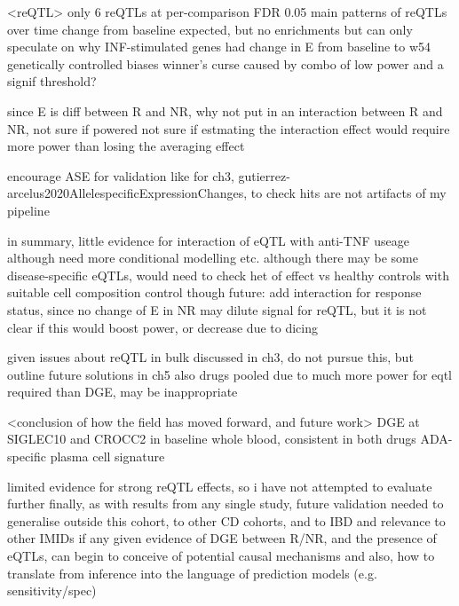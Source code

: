 \begin{outline}
\1 <reQTL>
    \2 only 6 reQTLs at per-comparison FDR 0.05
     main patterns of reQTLs over time
    \2 change from baseline expected, but no enrichments
    \2 but can only speculate on why INF-stimulated genes had change in E from baseline to w54 genetically controlled
    \2 biases
        \3 winner's curse caused by combo of low power and a signif threshold?

since E is diff between R and NR, 
why not put in an interaction between R and NR, not sure if powered
not sure if estmating the interaction effect would require more power
than losing the averaging effect

    \2 encourage ASE for validation like for ch3, gutierrez-arcelus2020AllelespecificExpressionChanges, to check hits are not artifacts of my pipeline

    \2 in summary, little evidence for interaction of eQTL with anti-TNF useage
        \3 although need more conditional modelling etc.
        \3 although there may be some disease-specific eQTLs, would need to check het of effect vs healthy controls with suitable cell composition control though
        \3 future: add interaction for response status, since no change of E in NR may dilute signal for reQTL, but it is not clear if this would boost power, or decrease due to dicing

    \2 given issues about reQTL in bulk discussed in ch3, do not pursue this, but outline future solutions in ch5
    also drugs pooled due to much more power for eqtl required than DGE, may be inappropriate

\1 <conclusion of how the field has moved forward, and future work>
    \2 DGE at SIGLEC10 and CROCC2 in baseline whole blood, consistent in both drugs
    \2 ADA-specific plasma cell signature

    \2 limited evidence for strong reQTL effects, so i have not attempted to evaluate further
    \2 finally, as with results from any single study, future validation needed to generalise outside this cohort, to other CD cohorts, and to IBD and relevance to other IMIDs if any
    \2 given evidence of DGE between R/NR, and the presence of eQTLs, can begin to conceive of potential causal mechanisms 
    \2 and also, how to translate from inference into the language of prediction models (e.g. sensitivity/spec)


\end{outline}
